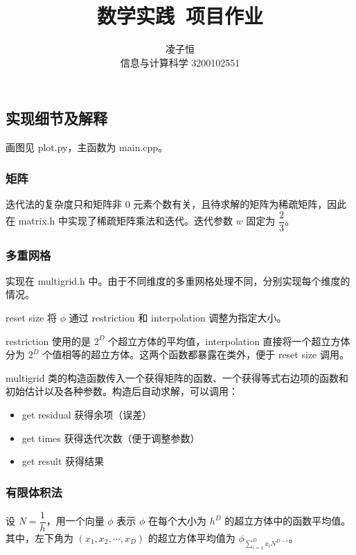 \documentclass[12pt]{ctexart}
\title{数学实践~项目作业}
\author{凌子恒 \\ 信息与计算科学 3200102551}
\begin{document}
\maketitle

\subsection*{实现细节及解释}

画图见 plot.py，主函数为 main.cpp。

\subsubsection*{矩阵}

迭代法的复杂度只和矩阵非 $0$ 元素个数有关，且待求解的矩阵为稀疏矩阵，因此在 matrix.h 中实现了稀疏矩阵乘法和迭代。迭代参数 $w$ 固定为 $\dfrac{2}{3}$。

\subsubsection*{多重网格}

实现在 multigrid.h 中。由于不同维度的多重网格处理不同，分别实现每个维度的情况。

reset size 将 $\phi$ 通过 restriction 和 interpolation 调整为指定大小。

restriction 使用的是 $2^D$ 个超立方体的平均值，interpolation 直接将一个超立方体分为 $2^D$ 个值相等的超立方体。这两个函数都暴露在类外，便于 reset size 调用。

multigrid 类的构造函数传入一个获得矩阵的函数、一个获得等式右边项的函数和初始估计以及各种参数。构造后自动求解，可以调用：

\begin{itemize}
	\item get residual 获得余项（误差）
	\item get times 获得迭代次数（便于调整参数）
	\item get result 获得结果
\end{itemize}

\subsubsection*{有限体积法}

设 $N=\dfrac{1}{h}$，用一个向量 $\phi$ 表示 $\phi$ 在每个大小为 $h^D$ 的超立方体中的函数平均值。其中，左下角为 $(x_1,x_2,\cdots,x_D)$ 的超立方体平均值为 $\phi_{\sum\limits_{i=1}^D x_iN^{D-i}}$。
\end{document}
